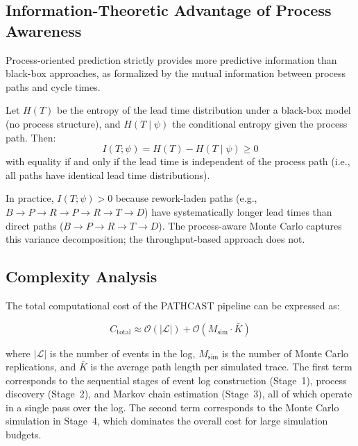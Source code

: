 \subsection{Information-Theoretic Advantage of Process Awareness}
\label{sec:prop-information}

Process-oriented prediction strictly provides more predictive information than black-box approaches, as formalized by the mutual information between process paths and cycle times.

\begin{theorem}
\label{thm:information}
Let $H(T)$ be the entropy of the lead time distribution under a 
black-box model (no process structure), and $H(T \mid \psi)$ the 
conditional entropy given the process path. Then:
\begin{equation}
\label{eq:information-gain}
I(T; \psi) = H(T) - H(T \mid \psi) \geq 0
\end{equation}
with equality if and only if the lead time is independent of the process 
path (i.e., all paths have identical lead time distributions).
\end{theorem}

In practice, $I(T; \psi) > 0$ because rework-laden paths (e.g., 
$B \to P \to R \to P \to R \to T \to D$) have systematically longer 
lead times than direct paths ($B \to P \to R \to T \to D$). The 
process-aware Monte Carlo captures this variance decomposition; the 
throughput-based approach does not.


\subsection{Complexity Analysis}
\label{sec:prop-complexity}
The total computational cost of the PATHCAST pipeline can be
expressed as:

\begin{equation}
\label{eq:total-cost}
C_{\text{total}} \approx \mathcal{O}(|\mathcal{L}|) + \mathcal{O}(M_{\text{sim}} \cdot \bar{K})
\end{equation}

\noindent where $|\mathcal{L}|$ is the number of events in the log,
$M_{\text{sim}}$ is the number of Monte Carlo replications, and $\bar{K}$
is the average path length per simulated trace. The first term corresponds
to the sequential stages of event log construction (Stage~1), process
discovery (Stage~2), and Markov chain estimation (Stage~3), all of which
operate in a single pass over the log. The second term corresponds to the
Monte Carlo simulation in Stage~4, which dominates the overall cost for
large simulation budgets.

